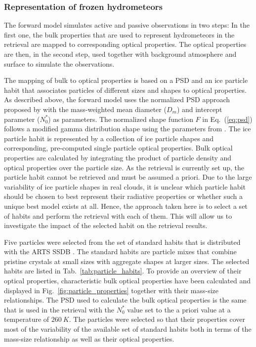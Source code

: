 \documentclass[journal abbreviation, manuscript]{copernicus}
\begin{document}
\subsubsection{Representation of frozen hydrometeors}

The forward model simulates active and passive observations in two steps: In the
first one, the bulk properties that are used to represent hydrometeors in the
retrieval are mapped to corresponding optical properties. The optical properties
are then, in the second step, used together with background atmosphere and
surface to simulate the observations.

The mapping of bulk to optical properties is based on a PSD and an ice particle
habit that associates particles of different sizes and shapes to optical
properties. As described above, the forward model uses the normalized PSD
approach proposed by \citet{delanoe05} with the mass-weighted mean diameter
($D_m$) and intercept parameter ($N_0^*$) as parameters. The normalized shape
function $F$ in Eq.~(\ref{eq:psd}) follows a modified gamma distribution shape
using the parameters from \citet{cazenave19}. The ice particle habit is
represented by a collection of ice particle shapes and corresponding,
pre-computed single particle optical properties. Bulk optical properties are
calculated by integrating the product of particle density and optical properties
over the particle size. As the retrieval is currently set up, the particle habit
cannot be retrieved and must be assumed a priori. Due to the large variability
of ice particle shapes in real clouds, it is unclear which particle habit should
be chosen to best represent their radiative properties or whether such a unique
best model exists at all. Hence, the approach taken here is to select a set of
habits and perform the retrieval with each of them. This will allow us to
investigate the impact of the selected habit on the retrieval results.

Five particles were selected from the set of standard habits that is distributed
with the ARTS SSDB \citep{eriksson18}. The standard habits are particle mixes
that combine pristine crystals at small sizes with aggregate shapes at larger
sizes. The selected habits are listed in Tab.~\ref{tab:particle_habits}. To
provide an overview of their optical properties, characteristic bulk optical
properties have been calculated and displayed in
Fig.~\ref{fig:particle_properties} together with their mass-size relationships.
The PSD used to calculate the bulk optical properties is the same that is used
in the retrieval with the $N_0^*$ value set to the a priori value at a
temperature of $260\ \unit{K}$. The particles were selected so that their
properties cover most of the variability of the available set of standard habits
both in terms of the mass-size relationship as well as their optical properties.
\end{document}
